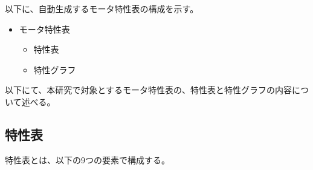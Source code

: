 以下に、自動生成するモータ特性表の構成を示す。
\begin{itemize}
	\item モータ特性表
	\begin{itemize}
		\item 特性表
		\item 特性グラフ
	\end{itemize}
\end{itemize}
以下にて、本研究で対象とするモータ特性表の、特性表と特性グラフの内容について述べる。
\subsection{特性表}\label{sub:tokuseihyou}
特性表とは、以下の9つの要素で構成する。
